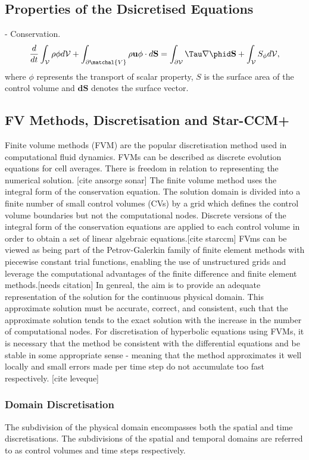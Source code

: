 \subsection{Properties of the Dsicretised Equations}
- Conservation. 
\begin{equation}
\frac{d}{dt}\int_{\mathcal{V}} \rho \phi d\mathcal{V}
+ \int_{\partial \matchal{V}} \rho \mathbf{u} \phi \cdot d\mathbf{S}
= \int_{\partial\mathcal{V}}\Tau\nabla\phid\mathbf{S} + \int_{\mathcal{V}} S_{\phi} d\mathcal{V},
\end{equation}
where $\phi$ represents the transport of scalar property, $S$ is the surface area 
of the control volume and $\mathbf{dS}$ denotes the surface vector.


\subsection{FV Methods, Discretisation and Star-CCM+}
Finite volume methods (FVM) are the popular discretisation method used in computational fluid dynamics. FVMs can be described 
as discrete evolution equations for cell averages. There is freedom in relation to representing the numerical solution. [cite ansorge sonar]
The finite volume method uses the integral form of the conservation equation. The solution domain is divided into a finite number of small control volumes (CVs)
by a grid which defines the control volume boundaries but not the computational nodes. Discrete versions of the integral form of the conservation 
equations are applied to each control volume in order to obtain a set of linear algebraic equations.[cite starccm] FVms can be viewed as being part
of the Petrov-Galerkin family of finite element methods with piecewise constant trial functions, enabling the use of 
unstructured grids and leverage the computational advantages of the finite difference and finite element methods.[needs citation] In genreal, the aim is to provide an adequate
representation of the solution for the continuous physical domain. This approximate solution must be accurate, correct, and consistent, such that the approximate solution
tends to the exact solution with the increase in the number of computational nodes. For discretisation of hyperbolic equations using FVMs, it is necessary that the method be consistent
with the differential equations and be stable in some appropriate sense - meaning that 
the method approximates it well locally and small errors made per time step do not accumulate too fast respectively. [cite leveque]
\subsubsection{Domain Discretisation}
The subdivision of the physical domain encompasses both the spatial and time discretisations. The subdivisions of the spatial and temporal domains are 
referred to as control volumes and time steps respectively.
